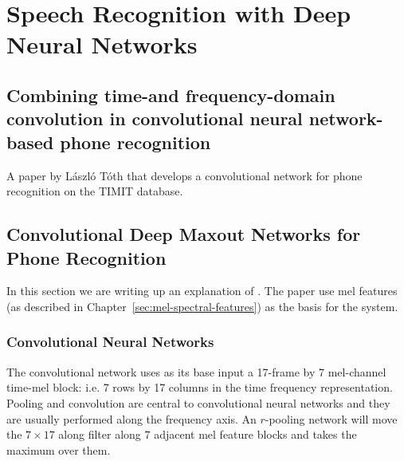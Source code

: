 \chapter{Speech Recognition with Deep Neural Networks}

\section{Combining time-and frequency-domain convolution in convolutional neural network-based phone recognition}

A paper by L{\'a}szl{\'o} T{\'o}th that develops a convolutional network for phone recognition
on the TIMIT database.


\section{Convolutional Deep Maxout Networks for Phone Recognition}
In this section we are writing up an explanation of 
\cite{toth2014convolutional}.  The paper use mel features
(as described in Chapter~\ref{sec:mel-spectral-features})
as the basis for the system.


\subsection{Convolutional Neural Networks}

The convolutional network uses as its base input a 17-frame by
7 mel-channel time-mel block: i.e. 7 rows by 17 columns in the
time frequency representation.  Pooling and convolution are central
to convolutional neural networks and they are usually performed
along the frequency axis.  An $r$-pooling network will move the $7\times 17$
along filter along $7$ adjacent mel feature blocks and takes the maximum over
them.
